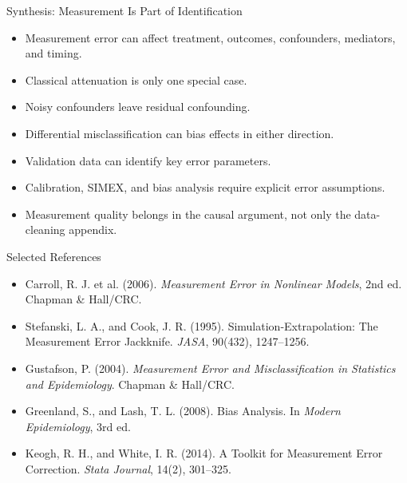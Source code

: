 \documentclass[aspectratio=169,11pt]{beamer}
\begin{document}
\begin{frame}{Synthesis: Measurement Is Part of Identification}
\begin{itemize}
\item Measurement error can affect treatment, outcomes, confounders, mediators, and timing.
\item Classical attenuation is only one special case.
\item Noisy confounders leave residual confounding.
\item Differential misclassification can bias effects in either direction.
\item Validation data can identify key error parameters.
\item Calibration, SIMEX, and bias analysis require explicit error assumptions.
\item Measurement quality belongs in the causal argument, not only the data-cleaning appendix.
\end{itemize}
\end{frame}

\begin{frame}{Selected References}
\small
\begin{itemize}
\item Carroll, R. J. et al. (2006). \textit{Measurement Error in Nonlinear Models}, 2nd ed. Chapman \& Hall/CRC.
\item Stefanski, L. A., and Cook, J. R. (1995). Simulation-Extrapolation: The Measurement Error Jackknife. \textit{JASA}, 90(432), 1247--1256.
\item Gustafson, P. (2004). \textit{Measurement Error and Misclassification in Statistics and Epidemiology}. Chapman \& Hall/CRC.
\item Greenland, S., and Lash, T. L. (2008). Bias Analysis. In \textit{Modern Epidemiology}, 3rd ed.
\item Keogh, R. H., and White, I. R. (2014). A Toolkit for Measurement Error Correction. \textit{Stata Journal}, 14(2), 301--325.
\end{itemize}
\end{frame}

\contactslide
\end{document}
